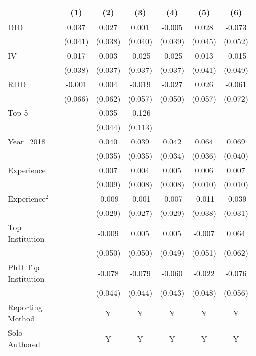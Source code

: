 \begin{tabular}{l*{6}{c}}
\hline\hline
                &\multicolumn{1}{c}{(1)}&\multicolumn{1}{c}{(2)}&\multicolumn{1}{c}{(3)}&\multicolumn{1}{c}{(4)}&\multicolumn{1}{c}{(5)}&\multicolumn{1}{c}{(6)}\\
\hline
DID             &    0.037&    0.027&    0.001&   -0.005&    0.028&   -0.073\\
                &  (0.041)&  (0.038)&  (0.040)&  (0.039)&  (0.045)&  (0.052)\\
IV              &    0.017&    0.003&   -0.025&   -0.025&    0.013&   -0.015\\
                &  (0.038)&  (0.037)&  (0.037)&  (0.037)&  (0.041)&  (0.049)\\
RDD             &   -0.001&    0.004&   -0.019&   -0.027&    0.026&   -0.061\\
                &  (0.066)&  (0.062)&  (0.057)&  (0.050)&  (0.057)&  (0.072)\\
Top 5           &         &    0.035&   -0.126&         &         &         \\
                &         &  (0.044)&  (0.113)&         &         &         \\
Year=2018       &         &    0.040&    0.039&    0.042&    0.064&    0.069\\
                &         &  (0.035)&  (0.035)&  (0.034)&  (0.036)&  (0.040)\\
Experience      &         &    0.007&    0.004&    0.005&    0.006&    0.007\\
                &         &  (0.009)&  (0.008)&  (0.008)&  (0.010)&  (0.010)\\
Experience$^2$  &         &   -0.009&   -0.001&   -0.007&   -0.011&   -0.039\\
                &         &  (0.029)&  (0.027)&  (0.029)&  (0.038)&  (0.031)\\
Top Institution &         &   -0.009&    0.005&    0.005&   -0.007&    0.064\\
                &         &  (0.050)&  (0.050)&  (0.049)&  (0.051)&  (0.062)\\
PhD Top Institution&         &   -0.078&   -0.079&   -0.060&   -0.022&   -0.076\\
                &         &  (0.044)&  (0.044)&  (0.043)&  (0.048)&  (0.056)\\
Reporting Method &         &        Y&        Y&        Y&        Y&        Y\\
Solo Authored   &         &        Y&        Y&        Y&        Y&        Y\\

\end{tabular}
